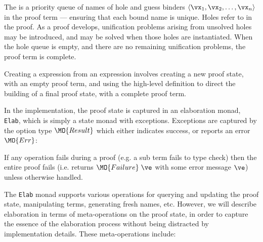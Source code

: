 The  is a priority queue of names of hole and guess binders 
$\langle\vx_1,\vx_2,\ldots,\vx_n\rangle$
in the proof term ---
ensuring that each bound name is unique. Holes refer to 
in the proof. As a proof develops, unification problems arising from unsolved
holes may be introduced, and may be solved when those holes are instantiated.
When the hole queue is empty, and there are no remaining unification 
problems, the proof term is complete.

Creating a \TT{} expression from an \Idris{} expression involves creating
a new proof state, with an empty proof term, and using the high-level definition
to direct the building of a final proof state, with a complete proof term.

In the implementation, the proof state is captured in an elaboration monad,
\texttt{Elab}, which is simply a state monad with exceptions. 
Exceptions are captured by the option type $\MO{Result}$ which
either indicates success, or reports an error $\MO{Err}$:


\noindent
If any operation fails during a proof (e.g. a sub term fails to type check)
then the entire proof fails (i.e. returns $\MO{Failure}\;\ve$ with some error
message $\ve$) unless otherwise handled.

The \texttt{Elab} monad supports various operations for querying and updating
the proof state, manipulating terms, generating fresh names, etc. However, we
will describe \Idris{} elaboration in terms of meta-operations on the proof
state, in order to capture the essence of the elaboration process without being
distracted by implementation details. These meta-operations include: 

